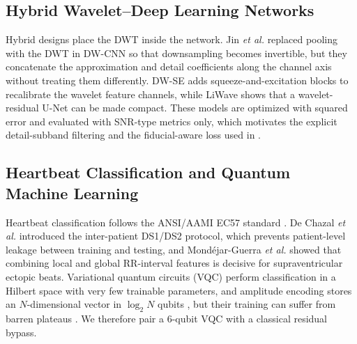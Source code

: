 \subsection{Hybrid Wavelet--Deep Learning Networks}
Hybrid designs place the DWT inside the network. Jin \emph{et al.} \cite{jin2024} replaced pooling with the DWT in DW-CNN so that downsampling becomes invertible, but they concatenate the approximation and detail coefficients along the channel axis without treating them differently. DW-SE \cite{nguyen2026dwse} adds squeeze-and-excitation blocks to recalibrate the wavelet feature channels, while LiWave \cite{nguyen2026liwave} shows that a wavelet-residual U-Net can be made compact. These models are optimized with squared error and evaluated with SNR-type metrics only, which motivates the explicit detail-subband filtering and the fiducial-aware loss used in \HSL{}.

\subsection{Heartbeat Classification and Quantum Machine Learning}
Heartbeat classification follows the ANSI/AAMI EC57 standard \cite{aami}. De Chazal \emph{et al.} \cite{dechazal2004} introduced the inter-patient DS1/DS2 protocol, which prevents patient-level leakage between training and testing, and Mond{\'e}jar-Guerra \emph{et al.} \cite{mondejar2019} showed that combining local and global RR-interval features is decisive for supraventricular ectopic beats. Variational quantum circuits (VQC) \cite{benedetti2019} perform classification in a Hilbert space with very few trainable parameters, and amplitude encoding stores an $N$-dimensional vector in $\log_2 N$ qubits \cite{pennylane2018}, but their training can suffer from barren plateaus \cite{mcclean2018}. We therefore pair a 6-qubit VQC with a classical residual bypass.

